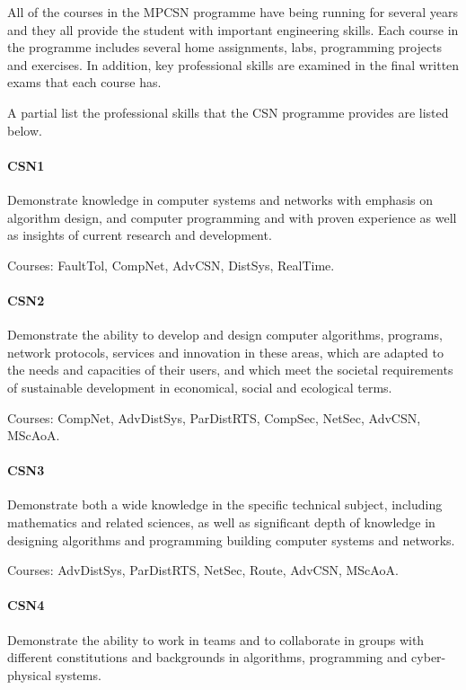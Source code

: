 

All of the courses in the MPCSN programme have being running for
several years and they all provide the student with important
engineering skills. Each course in the programme includes several home
assignments, labs, programming projects and exercises. In addition,
key professional skills are examined in the final written exams that
each course has.

A partial list the professional skills that the CSN programme provides
are listed below.

\paragraph{CSN1} Demonstrate knowledge in computer systems and
networks with emphasis on algorithm design, and computer programming
and with proven experience as well as insights of current research and
development.

Courses: FaultTol, CompNet, AdvCSN, DistSys, RealTime.

\paragraph{CSN2} Demonstrate the ability to develop and design
computer algorithms, programs, network protocols, services and
innovation in these areas, which are adapted to the needs and
capacities of their users, and which meet the societal requirements of
sustainable development in economical, social and ecological terms.

Courses: CompNet, AdvDistSys, ParDistRTS, CompSec, NetSec, AdvCSN,
MScAoA.

\paragraph{CSN3} Demonstrate both a wide knowledge in the specific
technical subject, including mathematics and related sciences, as well
as significant depth of knowledge in designing algorithms and
programming building computer systems and networks.

Courses: AdvDistSys, ParDistRTS, NetSec, Route, AdvCSN, MScAoA.

\paragraph{CSN4} Demonstrate the ability to work in teams and to
collaborate in groups with different constitutions and backgrounds in
algorithms, programming and cyber-physical systems.

